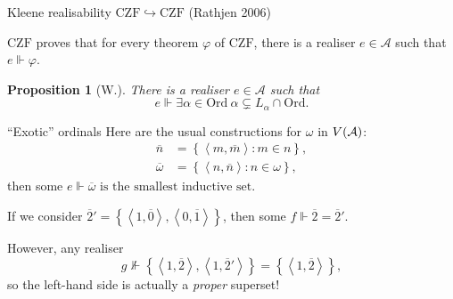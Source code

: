 \documentclass{beamer}
\newtheorem{proposition}{Proposition}
\theoremstyle{definition}
\newcommand{\tuple}[1]{\left\langle #1 \right\rangle}
\newcommand{\CZF}{\mathrm{CZF}}
\newcommand{\Ord}{\mathrm{Ord}}
\begin{document}
\begin{frame}{Kleene realisability $\CZF \hookrightarrow \CZF$ (Rathjen 2006)}
  \begin{theorem}[Rathjen, 2006]
    $\CZF$ proves that for every theorem $\varphi$ of $\CZF$, there is a realiser $e \in \mathcal{A}$ such that $e \Vdash \varphi$.
  \end{theorem}

  \pause

  \vspace{1em}
  \begin{proposition}[W.]
    There is a realiser $e \in \mathcal{A}$ such that
    \[e \Vdash \exists \alpha \in \Ord \ \alpha \subsetneq L_\alpha \cap \Ord.\]
  \end{proposition}
\end{frame}

\begin{frame}{``Exotic'' ordinals}
  Here are the usual constructions for $\omega$ in $V\mleft(\mathcal{A}\mright)$:
  \begin{align*}
    \overline{n}      & = \left\{\tuple{m, \overline{m}} : m \in n\right\},      \\
    \overline{\omega} & = \left\{\tuple{n, \overline{n}} : n \in \omega\right\},
  \end{align*}
  then some $e \Vdash \text{$\overline{\omega}$ is the smallest inductive set}$.

  \pause

  \vspace{1.6em}
  If we consider $\overline{2}' = \left\{\tuple{1, \overline{0}}, \tuple{0, \overline{1}}\right\}$, then some $f \Vdash \overline{2} = \overline{2}'$.

  \vspace{0.6em}

  However, any realiser
  \[g \nVdash \left\{\tuple{1, \overline{2}}, \tuple{1, \overline{2}'}\right\} = \left\{\tuple{1, \overline{2}}\right\},\]
  so the left-hand side is actually a \emph{proper} superset!
\end{frame}
\end{document}

